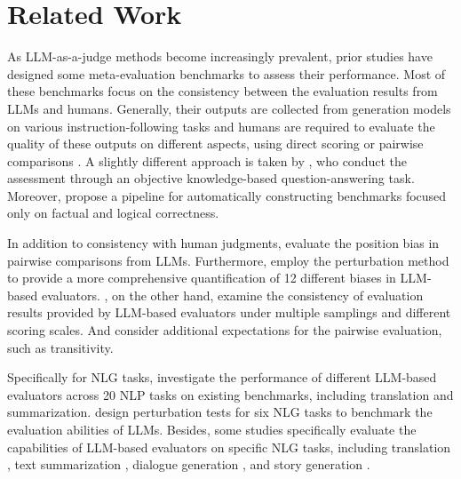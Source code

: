 \section{Related Work}
As LLM-as-a-judge methods become increasingly prevalent, prior studies have designed some meta-evaluation benchmarks to assess their performance. Most of these benchmarks focus on the consistency between the evaluation results from LLMs and humans. Generally, their outputs are collected from generation models on various instruction-following tasks and humans are required to evaluate the quality of these outputs on different aspects, using direct scoring \citep{DBLP:conf/iclr/YeKKHKJTKS24,DBLP:journals/corr/abs-2406-05761} or pairwise comparisons \citep{DBLP:conf/nips/ZhengC00WZL0LXZ23,DBLP:conf/iclr/ZengYG0G024,DBLP:journals/corr/abs-2308-01862}. A slightly different approach is taken by \citet{DBLP:journals/corr/abs-2406-12624}, who conduct the assessment through an objective knowledge-based question-answering task. Moreover, \citet{DBLP:journals/corr/abs-2410-12784} propose a pipeline for automatically constructing benchmarks focused only on factual and logical correctness.

In addition to consistency with human judgments, \citet{DBLP:conf/acl/WangLCCZLCKLLS24} evaluate the position bias in pairwise comparisons from LLMs. Furthermore, \citet{DBLP:journals/corr/abs-2410-02736} employ the perturbation method to provide a more comprehensive quantification of 12 different biases in LLM-based evaluators. \citet{DBLP:conf/coling/LeeHT25}, on the other hand, examine the consistency of evaluation results provided by LLM-based evaluators under multiple samplings and different scoring scales. And \citet{zhao-etal-2024-measuring} consider additional expectations for the pairwise evaluation, such as transitivity.

Specifically for NLG tasks, \citet{DBLP:journals/corr/abs-2406-18403} investigate the performance of different LLM-based evaluators across 20 NLP tasks on existing benchmarks, including translation and summarization. \citet{DBLP:journals/corr/abs-2408-13704} design perturbation tests for six NLG tasks to benchmark the evaluation abilities of LLMs. Besides, some studies specifically evaluate the capabilities of LLM-based evaluators on specific NLG tasks, including translation \citep{DBLP:conf/wmt/FreitagMDLAR0BK24}, text summarization \citep{DBLP:conf/naacl/LiuFCZHJLRWC24,DBLP:conf/acl/SiledarNMRNBBPS24}, dialogue generation \citep{DBLP:conf/emnlp/ZhangDTST023,DBLP:conf/emnlp/MendoncaTL24}, and story generation \citep{DBLP:journals/tacl/ChhunSC24}.
